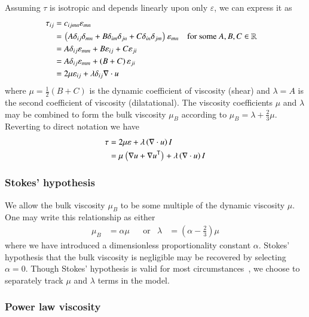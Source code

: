 \documentclass[letterpaper,11pt,nointlimits,reqno]{amsart}
\newcommand{\trans}[1]{{#1}^{\ensuremath{\mathsf{T}}}}
\begin{document}
Assuming $\tau$ is isotropic and depends linearly upon only $\varepsilon$,
we can express it as
\begin{align}
\tau_{ij}
&= c_{ijmn} \varepsilon_{mn}
\notag \\
&= \left( A \delta_{ij} \delta_{mn}
        + B \delta_{im} \delta_{jn}
        + C \delta_{in} \delta_{jm}
    \right) \varepsilon_{mn}
&
&\text{for some }A, B, C\in\mathbb{R}
\notag \\
&= A \delta_{ij} \varepsilon_{mm} + B\varepsilon_{ij} + C\varepsilon_{ji}
\notag \\
&= A \delta_{ij} \varepsilon_{mm} + \left( B+C \right)\varepsilon_{ji}
\notag \\
&= 2 \mu \varepsilon_{ij} + \lambda\delta_{ij}\nabla\cdot{}u
\end{align}
where $\mu=\frac{1}{2}\left( B + C \right)$ is the dynamic coefficient of
viscosity (shear) and $\lambda=A$ is the second coefficient of viscosity
(dilatational).  The viscosity coefficients $\mu$ and $\lambda$ may be combined
to form the bulk viscosity $\mu_{B}$ according to $\mu_{B}=\lambda +
\frac{2}{3}\mu$.  Reverting to direct notation we have
\begin{align}
\tau
&= 2 \mu \varepsilon + \lambda \left( \nabla\cdot{}u \right) I
\notag \\
\label{eq:taunewt}
&=   \mu \left( \nabla{}u + \trans{\nabla{}u} \right)
  + \lambda \left( \nabla\cdot{}u \right) I
\end{align}

\subsubsection{Stokes' hypothesis}
\label{sec:stokeshypothesis}

We allow the bulk viscosity $\mu_{B}$ to be some multiple of the dynamic
viscosity $\mu$.  One may write this relationship as either
\begin{align}
\label{eq:secondviscosityclaw}
\mu_{B} &= \alpha \mu
&
&\text{or}
&
\lambda &= \left( \alpha - \frac{2}{3} \right) \mu
\end{align}
where we have introduced a dimensionless proportionality constant $\alpha$.
Stokes' hypothesis that the bulk viscosity is negligible may be recovered by
selecting $\alpha = 0$.  Though Stokes' hypothesis is valid for most
circumstances~\cite{GadelHak1995}, we choose to separately track $\mu$ and
$\lambda$ terms in the model.

\subsubsection{Power law viscosity}
\end{document}
